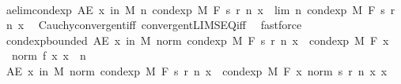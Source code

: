\begin{isabellebody}
\ \ \isamarkupfalse%
\ ae{\isacharunderscore}{\kern0pt}lim{\isacharunderscore}{\kern0pt}cond{\isacharunderscore}{\kern0pt}exp{\isacharcolon}{\kern0pt}\ {\isachardoublequoteopen}AE\ x\ in\ M{\isachardot}{\kern0pt}\ {\isacharparenleft}{\kern0pt}{\isasymlambda}n{\isachardot}{\kern0pt}\ cond{\isacharunderscore}{\kern0pt}exp\ M\ F\ {\isacharparenleft}{\kern0pt}s\ {\isacharparenleft}{\kern0pt}r\ n{\isacharparenright}{\kern0pt}{\isacharparenright}{\kern0pt}\ x{\isacharparenright}{\kern0pt}\ {\isasymlonglonglongrightarrow}\ lim\ {\isacharparenleft}{\kern0pt}{\isasymlambda}n{\isachardot}{\kern0pt}\ cond{\isacharunderscore}{\kern0pt}exp\ M\ F\ {\isacharparenleft}{\kern0pt}s\ {\isacharparenleft}{\kern0pt}r\ n{\isacharparenright}{\kern0pt}{\isacharparenright}{\kern0pt}\ x{\isacharparenright}{\kern0pt}{\isachardoublequoteclose}\ \isamarkupfalse%
\ Cauchy{\isacharunderscore}{\kern0pt}convergent{\isacharunderscore}{\kern0pt}iff\ convergent{\isacharunderscore}{\kern0pt}LIMSEQ{\isacharunderscore}{\kern0pt}iff\ \isamarkupfalse%
\ fastforce\isanewline
\isanewline
\ \ \isamarkupfalse%
\ cond{\isacharunderscore}{\kern0pt}exp{\isacharunderscore}{\kern0pt}bounded{\isacharcolon}{\kern0pt}\ {\isachardoublequoteopen}AE\ x\ in\ M{\isachardot}{\kern0pt}\ norm\ {\isacharparenleft}{\kern0pt}cond{\isacharunderscore}{\kern0pt}exp\ M\ F\ {\isacharparenleft}{\kern0pt}s\ {\isacharparenleft}{\kern0pt}r\ n{\isacharparenright}{\kern0pt}{\isacharparenright}{\kern0pt}\ x{\isacharparenright}{\kern0pt}\ {\isasymle}\ cond{\isacharunderscore}{\kern0pt}exp\ M\ F\ {\isacharparenleft}{\kern0pt}{\isasymlambda}x{\isachardot}{\kern0pt}\ {}\ {\isacharasterisk}{\kern0pt}\ norm\ {\isacharparenleft}{\kern0pt}f\ x{\isacharparenright}{\kern0pt}{\isacharparenright}{\kern0pt}\ x{\isachardoublequoteclose}\ \ n\isanewline
\ \ \isamarkupfalse%
\ {\isacharminus}{\kern0pt}\isanewline
\ \ \ \ \isamarkupfalse%
\ {\isachardoublequoteopen}AE\ x\ in\ M{\isachardot}{\kern0pt}\ norm\ {\isacharparenleft}{\kern0pt}cond{\isacharunderscore}{\kern0pt}exp\ M\ F\ {\isacharparenleft}{\kern0pt}s\ {\isacharparenleft}{\kern0pt}r\ n{\isacharparenright}{\kern0pt}{\isacharparenright}{\kern0pt}\ x{\isacharparenright}{\kern0pt}\ {\isasymle}\ cond{\isacharunderscore}{\kern0pt}exp\ M\ F\ {\isacharparenleft}{\kern0pt}{\isasymlambda}x{\isachardot}{\kern0pt}\ norm\ {\isacharparenleft}{\kern0pt}s\ {\isacharparenleft}{\kern0pt}r\ n{\isacharparenright}{\kern0pt}\ x{\isacharparenright}{\kern0pt}{\isacharparenright}{\kern0pt}\ x{\isachardoublequoteclose}\ \isamarkupfalse%

\end{isabellebody}
